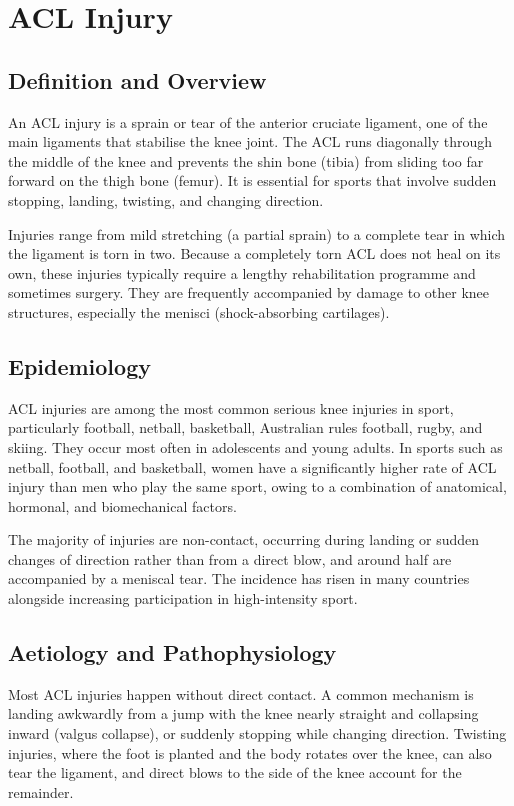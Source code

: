 \chapter{ACL Injury}

\section*{Definition and Overview}
An ACL injury is a sprain or tear of the anterior cruciate ligament, one of the main ligaments that stabilise the knee joint. The ACL runs diagonally through the middle of the knee and prevents the shin bone (tibia) from sliding too far forward on the thigh bone (femur). It is essential for sports that involve sudden stopping, landing, twisting, and changing direction.

Injuries range from mild stretching (a partial sprain) to a complete tear in which the ligament is torn in two. Because a completely torn ACL does not heal on its own, these injuries typically require a lengthy rehabilitation programme and sometimes surgery. They are frequently accompanied by damage to other knee structures, especially the menisci (shock-absorbing cartilages).

\section*{Epidemiology}
ACL injuries are among the most common serious knee injuries in sport, particularly football, netball, basketball, Australian rules football, rugby, and skiing. They occur most often in adolescents and young adults. In sports such as netball, football, and basketball, women have a significantly higher rate of ACL injury than men who play the same sport, owing to a combination of anatomical, hormonal, and biomechanical factors.

The majority of injuries are non-contact, occurring during landing or sudden changes of direction rather than from a direct blow, and around half are accompanied by a meniscal tear. The incidence has risen in many countries alongside increasing participation in high-intensity sport.

\section*{Aetiology and Pathophysiology}
Most ACL injuries happen without direct contact. A common mechanism is landing awkwardly from a jump with the knee nearly straight and collapsing inward (valgus collapse), or suddenly stopping while changing direction. Twisting injuries, where the foot is planted and the body rotates over the knee, can also tear the ligament, and direct blows to the side of the knee account for the remainder.

